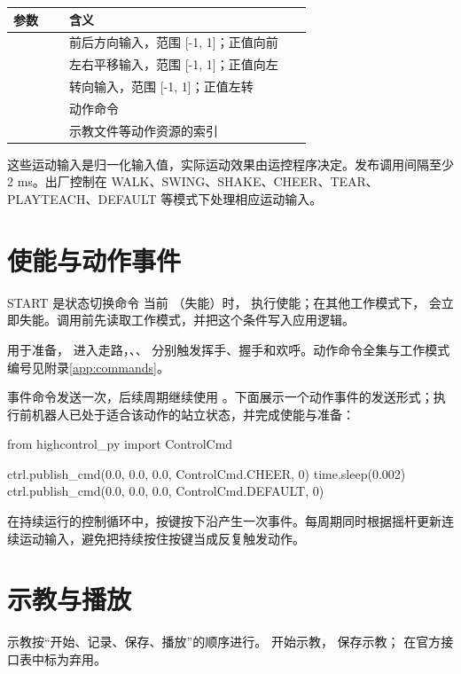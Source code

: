 \begingroup\small\renewcommand{\arraystretch}{1.15}
\begin{longtable}{@{}P{0.17\linewidth}P{0.74\linewidth}@{}}
\toprule
\textbf{参数} & \textbf{含义} \\
\midrule\endhead
{} & 前后方向输入，范围 [-1, 1]；正值向前 \\
 & 左右平移输入，范围 [-1, 1]；正值向左 \\
 & 转向输入，范围 [-1, 1]；正值左转 \\
 &  动作命令 \\
 & 示教文件等动作资源的索引 \\
\bottomrule\end{longtable}\endgroup

这些运动输入是归一化输入值，实际运动效果由运控程序决定。发布调用间隔至少 2 ms。出厂控制在 WALK、SWING、SHAKE、CHEER、TEAR、PLAYTEACH、DEFAULT 等模式下处理相应运动输入。
\section{使能与动作事件}
\begin{remark}{START 是状态切换命令}
当前 （失能）时， 执行使能；在其他工作模式下， 会立即失能。调用前先读取工作模式，并把这个条件写入应用逻辑。
\end{remark}
 用于准备， 进入走路，、、 分别触发挥手、握手和欢呼。动作命令全集与工作模式编号见附录\ref{app:commands}。

事件命令发送一次，后续周期继续使用 。下面展示一个动作事件的发送形式；执行前机器人已处于适合该动作的站立状态，并完成使能与准备：
\par\noindent\begin{minipage}{\linewidth}
\begin{command}
from highcontrol_py import ControlCmd

ctrl.publish_cmd(0.0, 0.0, 0.0, ControlCmd.CHEER, 0)
time.sleep(0.002)
ctrl.publish_cmd(0.0, 0.0, 0.0, ControlCmd.DEFAULT, 0)
\end{command}
\end{minipage}\par

在持续运行的控制循环中，按键按下沿产生一次事件。每周期同时根据摇杆更新连续运动输入，避免把持续按住按键当成反复触发动作。
\section{示教与播放}
示教按“开始、记录、保存、播放”的顺序进行。 开始示教， 保存示教； 在官方接口表中标为弃用。


